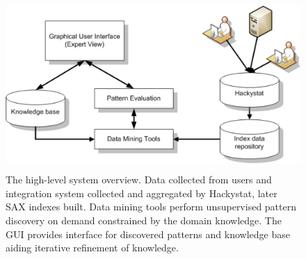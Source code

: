 \documentclass[11pt,oneside]{article}
\begin{document}
\begin{figure}[tbp]
   \centering
   \includegraphics[height=65mm]{system_overview.eps}
   \caption{The high-level system overview. Data collected from users and integration system collected and aggregated by Hackystat, later SAX indexes built. Data mining tools perform unsupervised pattern discovery on demand constrained by the domain knowledge. The GUI provides interface for discovered patterns and knowledge base aiding iterative refinement of knowledge.}
   \label{fig:system_overview}
\end{figure}




\end{document}
